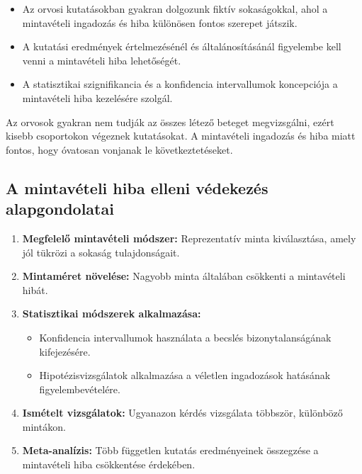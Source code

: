 \documentclass[a4paper,12pt]{article}
\begin{document}
    \begin{itemize}
        \item Az orvosi kutatásokban gyakran dolgozunk fiktív sokaságokkal, ahol a mintavételi ingadozás és hiba különösen fontos szerepet játszik.
        \item A kutatási eredmények értelmezésénél és általánosításánál figyelembe kell venni a mintavételi hiba lehetőségét.
        \item A statisztikai szignifikancia és a konfidencia intervallumok koncepciója a mintavételi hiba kezelésére szolgál.
    \end{itemize}

    Az orvosok gyakran nem tudják az összes létező beteget megvizsgálni, ezért kisebb csoportokon végeznek kutatásokat. A mintavételi ingadozás és hiba miatt fontos, hogy óvatosan vonjanak le következtetéseket.

    \subsection{A mintavételi hiba elleni védekezés alapgondolatai}

    \begin{enumerate}
        \item \textbf{Megfelelő mintavételi módszer:} Reprezentatív minta kiválasztása, amely jól tükrözi a sokaság tulajdonságait.

        \item \textbf{Mintaméret növelése:} Nagyobb minta általában csökkenti a mintavételi hibát.

        \item \textbf{Statisztikai módszerek alkalmazása:}
        \begin{itemize}
            \item Konfidencia intervallumok használata a becslés bizonytalanságának kifejezésére.
            \item Hipotézisvizsgálatok alkalmazása a véletlen ingadozások hatásának figyelembevételére.
        \end{itemize}

        \item \textbf{Ismételt vizsgálatok:} Ugyanazon kérdés vizsgálata többször, különböző mintákon.

        \item \textbf{Meta-analízis:} Több független kutatás eredményeinek összegzése a mintavételi hiba csökkentése érdekében.
    \end{enumerate}
\end{document}
